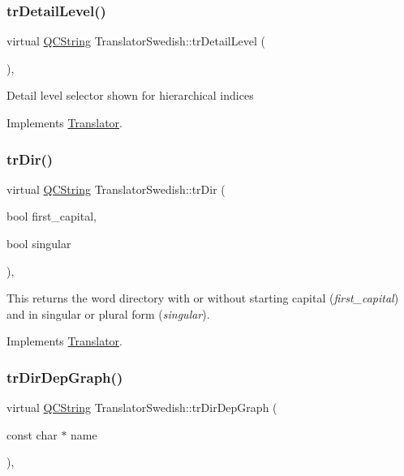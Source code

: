 \subsubsection{\texorpdfstring{trDetailLevel()}{trDetailLevel()}}
{\footnotesize\ttfamily virtual \mbox{\hyperlink{class_q_c_string}{Q\+C\+String}} Translator\+Swedish\+::tr\+Detail\+Level (\begin{DoxyParamCaption}{ }\end{DoxyParamCaption})\hspace{0.3cm}{\ttfamily [inline]}, {\ttfamily [virtual]}}

Detail level selector shown for hierarchical indices 

Implements \mbox{\hyperlink{class_translator}{Translator}}.

\mbox{\label{class_translator_swedish_a92528ca51cc0b45f6c3bc362e28c3066}} 
\subsubsection{\texorpdfstring{trDir()}{trDir()}}
{\footnotesize\ttfamily virtual \mbox{\hyperlink{class_q_c_string}{Q\+C\+String}} Translator\+Swedish\+::tr\+Dir (\begin{DoxyParamCaption}\item[{bool}]{first\+\_\+capital,  }\item[{bool}]{singular }\end{DoxyParamCaption})\hspace{0.3cm}{\ttfamily [inline]}, {\ttfamily [virtual]}}

This returns the word directory with or without starting capital ({\itshape first\+\_\+capital}) and in singular or plural form ({\itshape singular}). 

Implements \mbox{\hyperlink{class_translator}{Translator}}.

\mbox{\label{class_translator_swedish_a17e377bd550dda7cf01de85bfcd56ab5}} 
\subsubsection{\texorpdfstring{trDirDepGraph()}{trDirDepGraph()}}
{\footnotesize\ttfamily virtual \mbox{\hyperlink{class_q_c_string}{Q\+C\+String}} Translator\+Swedish\+::tr\+Dir\+Dep\+Graph (\begin{DoxyParamCaption}\item[{const char $\ast$}]{name }\end{DoxyParamCaption})\hspace{0.3cm}{\ttfamily [inline]}, {\ttfamily [virtual]}}

